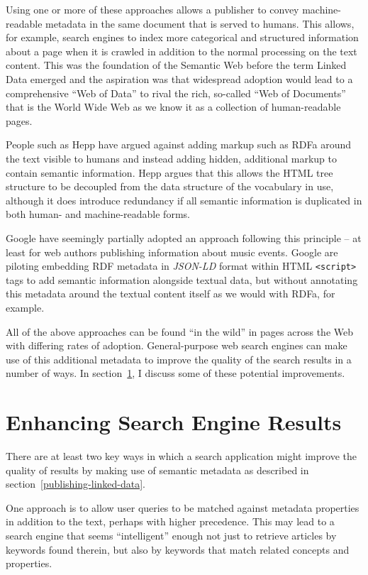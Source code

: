Using one or more of these approaches allows a publisher to convey
machine-readable metadata in the same document that is served to humans.
This allows, for example, search engines to index more categorical and
structured information about a page when it is crawled in addition to the
normal processing on the text content. This was the foundation of the
Semantic Web\cite{berners2001semantic} before the term Linked Data
emerged and the aspiration was that widespread adoption would lead to
a comprehensive ``Web of Data'' to rival the rich, so-called
``Web of Documents'' that is the World Wide Web as we know it as a collection
of human-readable pages.

People such as Hepp have argued against adding markup such as RDFa around
the text visible to humans and instead adding hidden, additional markup to
contain semantic information.\cite{hepp2009rdf2rdfa} Hepp argues that
this allows the HTML tree structure to be decoupled from the data structure
of the vocabulary in use, although it does introduce redundancy if all
semantic information is duplicated in both human- and machine-readable forms.

Google have seemingly partially adopted an approach following this principle
-- at least for web authors publishing information about music
events.\cite{googlejsonld} Google are piloting embedding RDF metadata in
\emph{JSON-LD} format within HTML \texttt{<script>} tags to add semantic
information alongside textual data, but without annotating this metadata
around the textual content itself as we would with RDFa, for example.

All of the above approaches can be found ``in the wild'' in pages across
the Web with differing rates of adoption. General-purpose web search
engines can make use of this additional metadata to improve the quality
of the search results in a number of ways. In section~\ref{enhancing-results},
I discuss some of these potential improvements.

\section{Enhancing Search Engine Results}
\label{enhancing-results}

There are at least two key ways in which a search application might
improve the quality of results by making use of semantic metadata as
described in section~\ref{publishing-linked-data}.

One approach is to allow
user queries to be matched against metadata properties in addition
to the text, perhaps with higher precedence. This may lead to a search
engine that seems ``intelligent'' enough not just to retrieve articles
by keywords found therein, but also by keywords that match related
concepts and properties.

